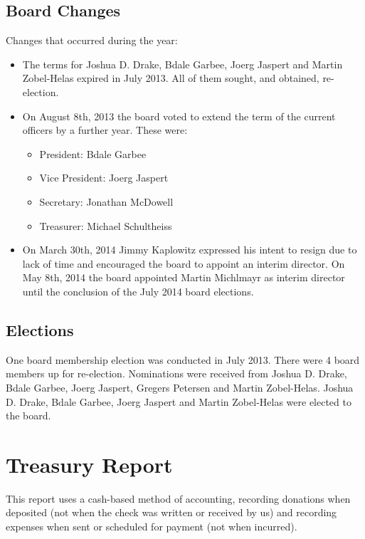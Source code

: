 \documentclass[letterpaper]{report}
\begin{document}
\section{Board Changes}

Changes that occurred during the year:

\begin{itemize}
\item The terms for Joshua D. Drake, Bdale Garbee, Joerg Jaspert and
Martin Zobel-Helas expired in July 2013. All of them sought, and
obtained, re-election.
\item On August 8th, 2013 the board voted to extend the term of the current
officers by a further year. These were:
\begin{itemize}
\item President: Bdale Garbee
\item Vice President: Joerg Jaspert
\item Secretary: Jonathan McDowell
\item Treasurer: Michael Schultheiss
\end{itemize}
\item On March 30th, 2014 Jimmy Kaplowitz expressed his intent to resign
due to lack of time and encouraged the board to appoint an interim
director.  On May 8th, 2014 the board appointed Martin Michlmayr as
interim director until the conclusion of the July 2014 board elections.
\end{itemize}

\section{Elections}

One board membership election was conducted in July 2013. There were 4
board members up for re-election.  Nominations were received from Joshua D.
Drake, Bdale Garbee, Joerg Jaspert, Gregers Petersen and Martin
Zobel-Helas.  Joshua D. Drake, Bdale Garbee, Joerg Jaspert and Martin
Zobel-Helas were elected to the board.

\chapter{Treasury Report}

This report uses a cash-based method of accounting, recording donations when
deposited (not when the check was written or received by us) and recording
expenses when sent or scheduled for payment (not when incurred).
\end{document}
